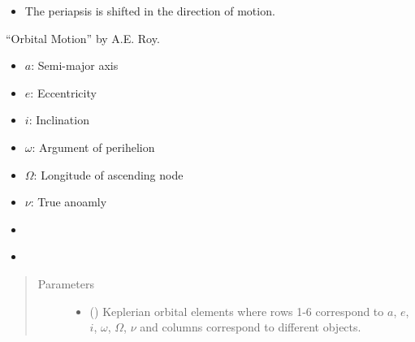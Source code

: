 \documentclass[letterpaper,10pt,english]{sphinxmanual}
\begin{document}
\begin{fulllineitems}
\begin{description}
\begin{itemize}
\item {} 
The periapsis is shifted in the direction of motion.

\end{itemize}

 “Orbital Motion” by A.E. Roy.

\item[{\sphinxstylestrong{Variables:}}] \leavevmode\begin{itemize}
\item {} 
\(a\): Semi-major axis

\item {} 
\(e\): Eccentricity

\item {} 
\(i\): Inclination

\item {} 
\(\omega\): Argument of perihelion

\item {} 
\(\Omega\): Longitude of ascending node

\item {} 
\(\nu\): True anoamly

\end{itemize}

\item[{\sphinxstylestrong{Uses:}}] \leavevmode\begin{itemize}
\item {} 
{\hyperref[\detokenize{modules/dpt_tools:dpt_tools.true2eccentric}]{}}

\item {} 
{\hyperref[\detokenize{modules/dpt_tools:dpt_tools.elliptic_radius}]{}}

\end{itemize}

\end{description}
\begin{quote}\begin{description}
\item[{Parameters}] \leavevmode\begin{itemize}
\item {} 
 () \textendash{} Keplerian orbital elements where rows 1-6 correspond to \(a\), \(e\), \(i\), \(\omega\), \(\Omega\), \(\nu\) and columns correspond to different objects.


\end{itemize}
\end{description}
\end{quote}
\end{fulllineitems}
\end{document}
